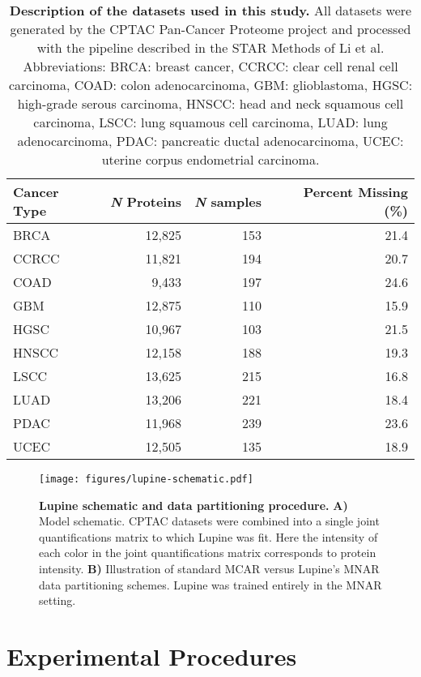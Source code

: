 \documentclass{article}
\begin{document}
\begin{table}
  \centering
  \begin{tabular}{lrrr}
    \hline
    Cancer Type & \textit{N} Proteins & \textit{N} samples & Percent Missing (\%) \\
    \hline
    BRCA & 12,825 & 153 & 21.4 \\
    CCRCC & 11,821 & 194 & 20.7 \\
    COAD & 9,433 & 197 & 24.6 \\
    GBM & 12,875 & 110 & 15.9 \\
    HGSC & 10,967 & 103 & 21.5 \\
    HNSCC & 12,158 & 188 & 19.3 \\
    LSCC & 13,625 & 215 & 16.8 \\
    LUAD & 13,206 & 221 & 18.4 \\
    PDAC & 11,968 & 239 & 23.6 \\
    UCEC & 12,505 & 135 & 18.9 \\
    \hline
  \end{tabular}
  \caption{{\bf Description of the datasets used in this study.} 
  All datasets were generated by the CPTAC Pan-Cancer Proteome project and processed with the pipeline described in the STAR Methods of Li et al\cite{pan-cancer}. 
  Abbreviations: BRCA: breast cancer, CCRCC: clear cell renal cell carcinoma, COAD: colon adenocarcinoma, GBM: glioblastoma, HGSC: high-grade serous carcinoma, HNSCC: head and neck squamous cell carcinoma, LSCC: lung squamous cell carcinoma, LUAD: lung adenocarcinoma, PDAC: pancreatic ductal adenocarcinoma, UCEC: uterine corpus endometrial carcinoma.}
    \label{tab:cptac-description}
\end{table}

\begin{figure}
  \centering
  \texttt{[image: figures/lupine-schematic.pdf]}
  \caption{{\bf Lupine schematic and data partitioning procedure.} 
  \textbf{A)} Model schematic. 
  CPTAC datasets were combined into a single joint quantifications matrix to which Lupine was fit. Here the intensity of each color in the joint quantifications matrix corresponds to protein intensity.
  \textbf{B)} Illustration of standard MCAR versus Lupine's MNAR data partitioning schemes. Lupine was trained entirely in the MNAR setting.}
  \label{fig:model-schematic}
\end{figure}

\section{Experimental Procedures}
\end{document}
